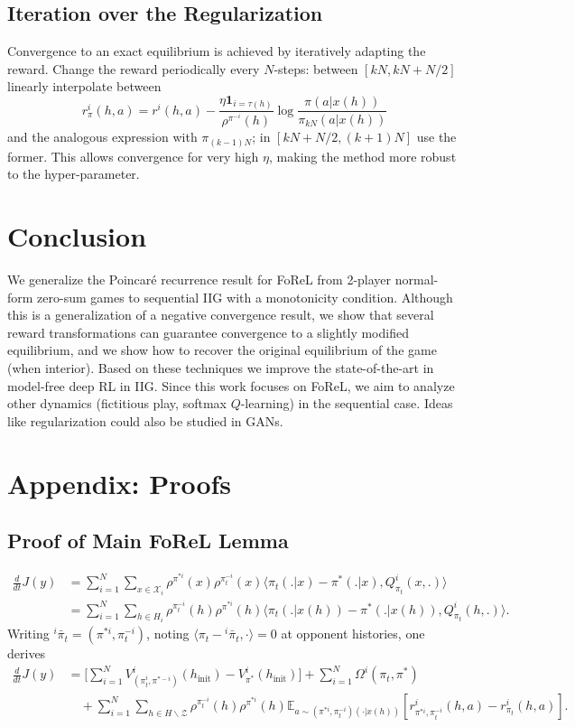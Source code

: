 \subsection{Iteration over the Regularization}
Convergence to an exact equilibrium is achieved by iteratively adapting the reward. Change the reward periodically every $N$-steps: between $[kN, kN+N/2]$ linearly interpolate between
$$r^i_\pi(h, a) = r^i(h, a) - \frac{\eta \mathbf{1}_{i=\tau(h)}}{\rho^{\pi^{-i}}(h)} \log \frac{\pi(a|x(h))}{\pi_{kN}(a|x(h))}$$
and the analogous expression with $\pi_{(k-1)N}$; in $[kN+N/2, (k+1)N]$ use the former. This allows convergence for very high $\eta$, making the method more robust to the hyper-parameter.

\section{Conclusion}
We generalize the Poincar\'e recurrence result for FoReL from 2-player normal-form zero-sum games to sequential IIG with a monotonicity condition. Although this is a generalization of a negative convergence result, we show that several reward transformations can guarantee convergence to a slightly modified equilibrium, and we show how to recover the original equilibrium of the game (when interior). Based on these techniques we improve the state-of-the-art in model-free deep RL in IIG. Since this work focuses on FoReL, we aim to analyze other dynamics (fictitious play, softmax $Q$-learning) in the sequential case. Ideas like regularization could also be studied in GANs.

\section{Appendix: Proofs}

\subsection{Proof of Main FoReL Lemma}
\begin{align*}
\frac{d}{dt}J(y) &= \sum_{i=1}^N \sum_{x \in \mathcal{X}_i} \rho^{\pi^{*i}}(x) \rho^{\pi_t^{-i}}(x) \langle\pi_t(.|x)-\pi^*(.|x), Q^i_{\pi_t}(x,.)\rangle\\
&= \sum_{i=1}^N \sum_{h \in H_i} \rho^{\pi_t^{-i}}(h)\rho^{\pi^{*i}}(h) \langle\pi_t(.|x(h))-\pi^*(.|x(h)), Q^i_{\pi_t}(h,.)\rangle.
\end{align*}
Writing ${}^i\bar\pi_t = (\pi^{*i}, \pi^{-i}_t)$, noting $\langle \pi_t - {}^i\bar\pi_t, \cdot\rangle = 0$ at opponent histories, one derives
\begin{align*}
\frac{d}{dt}J(y) &= \Bigg[\sum_{i=1}^N V^i_{(\pi^i_t, \pi^{*-i})}(h_{\textrm{init}}) - V^i_{\pi^*}(h_{\textrm{init}})\Bigg] + \sum_{i=1}^N \Omega^i(\pi_t, \pi^*)\\
&\quad + \sum_{i=1}^N \sum_{h \in H\backslash\mathcal{Z}} \rho^{\pi_t^{-i}}(h)\rho^{\pi^{*i}}(h) \mathbb{E}_{a \sim (\pi^{*i}, \pi_t^{-i})(\cdot|x(h))}\!\left[r^i_{\pi^{*i}, \pi_t^{-i}}(h,a) - r^i_{\pi_t}(h,a)\right].
\end{align*}

